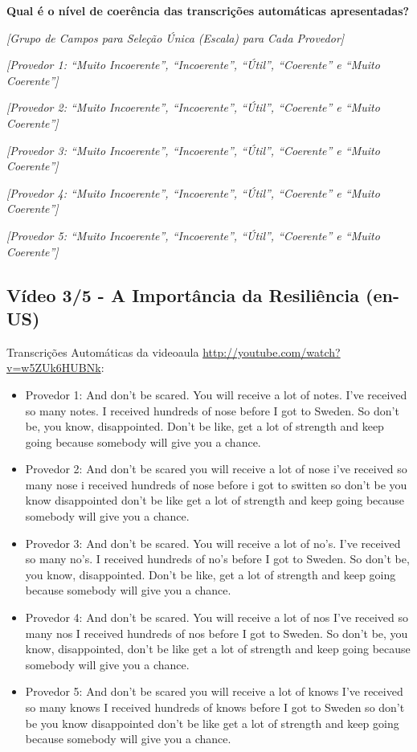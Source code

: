 \noindent
\textbf{Qual é o nível de coerência das transcrições automáticas apresentadas?}

\noindent
\textit{[Grupo de Campos para Seleção Única (Escala) para Cada Provedor]}

\noindent
\textit{[Provedor 1: ``Muito Incoerente'', ``Incoerente'', ``Útil'', ``Coerente'' e ``Muito Coerente'']}

\noindent
\textit{[Provedor 2: ``Muito Incoerente'', ``Incoerente'', ``Útil'', ``Coerente'' e ``Muito Coerente'']}

\noindent
\textit{[Provedor 3: ``Muito Incoerente'', ``Incoerente'', ``Útil'', ``Coerente'' e ``Muito Coerente'']}

\noindent
\textit{[Provedor 4: ``Muito Incoerente'', ``Incoerente'', ``Útil'', ``Coerente'' e ``Muito Coerente'']}

\noindent
\textit{[Provedor 5: ``Muito Incoerente'', ``Incoerente'', ``Útil'', ``Coerente'' e ``Muito Coerente'']}

\subsection{Vídeo 3/5 - A Importância da Resiliência (en-US)}

\noindent
Transcrições Automáticas da videoaula \url{http://youtube.com/watch?v=w5ZUk6HUBNk}:

\begin{itemize}
    \item Provedor 1: And don't be scared. You will receive a lot of notes. I've received so many notes. I received hundreds of nose before I got to Sweden. So don't be, you know, disappointed. Don't be like, get a lot of strength and keep going because somebody will give you a chance.
    \item Provedor 2: And don't be scared you will receive a lot of nose i've received so many nose i received hundreds of nose before i got to switten so don't be you know disappointed don't be like get a lot of strength and keep going because somebody will give you a chance.
    \item Provedor 3: And don't be scared. You will receive a lot of no's. I've received so many no's. I received hundreds of no's before I got to Sweden. So don't be, you know, disappointed. Don't be like, get a lot of strength and keep going because somebody will give you a chance.
    \item Provedor 4: And don't be scared. You will receive a lot of nos I've received so many nos I received hundreds of nos before I got to Sweden. So don't be, you know, disappointed, don't be like get a lot of strength and keep going because somebody will give you a chance.
    \item Provedor 5: And don't be scared you will receive a lot of knows I've received so many knows I received hundreds of knows before I got to Sweden so don't be you know disappointed don't be like get a lot of strength and keep going because somebody will give you a chance.
\end{itemize}

